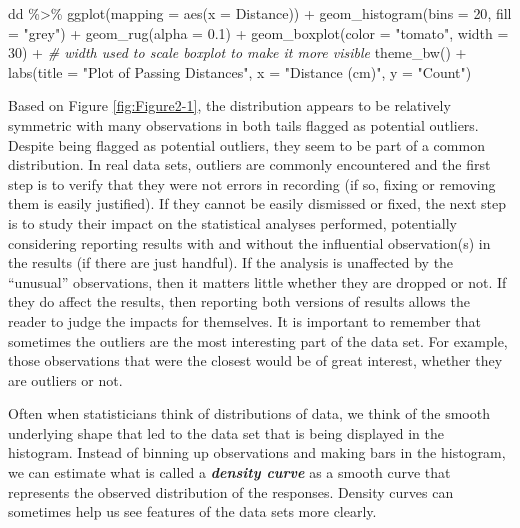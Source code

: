 \documentclass[
]{book}
\newenvironment{Shaded}{\begin{snugshade}}{\end{snugshade}}
\newcommand{\AttributeTok}[1]{\textcolor[rgb]{0.77,0.63,0.00}{#1}}
\newcommand{\CommentTok}[1]{\textcolor[rgb]{0.56,0.35,0.01}{\textit{#1}}}
\newcommand{\DecValTok}[1]{\textcolor[rgb]{0.00,0.00,0.81}{#1}}
\newcommand{\FloatTok}[1]{\textcolor[rgb]{0.00,0.00,0.81}{#1}}
\newcommand{\FunctionTok}[1]{\textcolor[rgb]{0.00,0.00,0.00}{#1}}
\newcommand{\NormalTok}[1]{#1}
\newcommand{\SpecialCharTok}[1]{\textcolor[rgb]{0.00,0.00,0.00}{#1}}
\newcommand{\StringTok}[1]{\textcolor[rgb]{0.31,0.60,0.02}{#1}}
\begin{document}
\begin{Shaded}
\begin{Highlighting}[]
\NormalTok{dd }\SpecialCharTok{\%\textgreater{}\%} \FunctionTok{ggplot}\NormalTok{(}\AttributeTok{mapping =} \FunctionTok{aes}\NormalTok{(}\AttributeTok{x =}\NormalTok{ Distance)) }\SpecialCharTok{+}
  \FunctionTok{geom\_histogram}\NormalTok{(}\AttributeTok{bins =} \DecValTok{20}\NormalTok{, }\AttributeTok{fill =} \StringTok{"grey"}\NormalTok{) }\SpecialCharTok{+}
  \FunctionTok{geom\_rug}\NormalTok{(}\AttributeTok{alpha =} \FloatTok{0.1}\NormalTok{) }\SpecialCharTok{+}
  \FunctionTok{geom\_boxplot}\NormalTok{(}\AttributeTok{color =} \StringTok{"tomato"}\NormalTok{, }\AttributeTok{width =} \DecValTok{30}\NormalTok{) }\SpecialCharTok{+} 
      \CommentTok{\# width used to scale boxplot to make it more visible}
  \FunctionTok{theme\_bw}\NormalTok{() }\SpecialCharTok{+}
  \FunctionTok{labs}\NormalTok{(}\AttributeTok{title =} \StringTok{"Plot of Passing Distances"}\NormalTok{,}
       \AttributeTok{x =} \StringTok{"Distance (cm)"}\NormalTok{,}
       \AttributeTok{y =} \StringTok{"Count"}\NormalTok{)}
\end{Highlighting}
\end{Shaded}

\indent Based on Figure \ref{fig:Figure2-1}, the distribution appears to be relatively symmetric with many observations in both tails flagged as potential
outliers. Despite being flagged as potential outliers, they seem to be part of a common distribution. In real data sets, outliers are commonly encountered and the
first step is to verify that they were not errors in recording (if so, fixing or removing them is easily justified). If they cannot be easily dismissed or fixed, the next step
is to study their impact on the statistical analyses performed, potentially
considering reporting results with and without the influential observation(s)
in the results (if there are just handful). If the analysis is unaffected by the ``unusual'' observations,
then it matters little whether they are dropped or not. If they do affect the
results, then reporting both versions of results allows the reader to judge the
impacts for themselves. It is important to remember that sometimes the outliers
are the most interesting part of the data set.  For example, those observations that were the closest would be of great interest, whether they are outliers or not.

\indent Often when statisticians think of distributions of data, we think
of the smooth underlying
shape that led to the data set that is being displayed in the histogram.
Instead of binning up observations and making bars in the histogram, we can
estimate what is called a \textbf{\emph{density curve}} as a smooth curve
that represents the observed distribution of the responses. Density curves can
sometimes help us see features of the data sets more clearly. 
\end{document}
